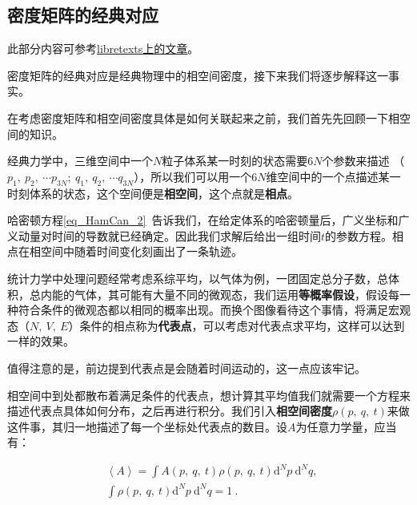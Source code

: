 \subsection{密度矩阵的经典对应}


此部分内容可参考\href{https://chem.libretexts.org/Bookshelves/Physical_and_Theoretical_Chemistry_Textbook_Maps/Supplemental_Modules_(Physical_and_Theoretical_Chemistry)/Statistical_Mechanics/Fundamentals_of_Statistical_Mechanics/09._Classical_and_quantum_dynamics_of_density_matrices}{libretexts上的文章}。

密度矩阵的经典对应是经典物理中的相空间密度，接下来我们将逐步解释这一事实。

在考虑密度矩阵和相空间密度具体是如何关联起来之前，我们首先先回顾一下相空间的知识。

经典力学中，三维空间中一个$N$粒子体系某一时刻的状态需要$6N$个参数来描述 （$p_1,~p_2,~\cdots p_{3N};~q_1,~q_2,~\cdots q_{3N}$），所以我们可以用一个$6N$维空间中的一个点描述某一时刻体系的状态，这个空间便是\textbf{相空间}，这个点就是\textbf{相点}。

哈密顿方程\autoref{eq_HamCan_2}~告诉我们，在给定体系的哈密顿量后，广义坐标和广义动量对时间的导数就已经确定。因此我们求解后给出一组时间$t$的参数方程。相点在相空间中随着时间变化刻画出了一条轨迹。

统计力学中处理问题经常考虑系综平均，以气体为例，一团固定总分子数，总体积，总内能的气体，其可能有大量不同的微观态，我们运用\textbf{等概率假设}，假设每一种符合条件的微观态都以相同的概率出现。而换个图像看待这个事情，将满足宏观态（$N,~V,~E$）条件的相点称为\textbf{代表点}，可以考虑对代表点求平均，这样可以达到一样的效果。

值得注意的是，前边提到代表点是会随着时间运动的，这一点应该牢记。

相空间中到处都散布着满足条件的代表点，想计算其平均值我们就需要一个方程来描述代表点具体如何分布，之后再进行积分。我们引入\textbf{相空间密度}$\rho\left(p,~q,~t\right)$来做这件事，其归一地描述了每一个坐标处代表点的数目。设$A$为任意力学量，应当有：

\begin{equation}\label{eq_denMat_7}
\begin{aligned}
&\left\langle A \right\rangle = \int A \left(p,~q,~t\right)\rho\left(p,~q,~t \right) \mathrm{d}^Np~\mathrm{d}^Nq ,\\
&\int \rho\left(p,~q,~t \right) \mathrm{d}^Np~\mathrm{d}^Nq = 1~.
\end{aligned}~
\end{equation}


